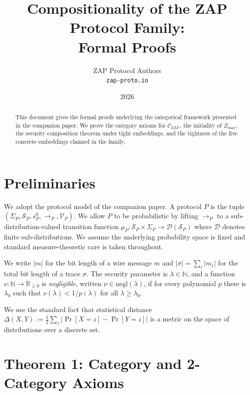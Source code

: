 \documentclass[11pt]{article}
\title{Compositionality of the ZAP Protocol Family:\\Formal Proofs}
\author{ZAP Protocol Authors\\\texttt{zap-proto.io}}
\date{2026}
\theoremstyle{definition}
\theoremstyle{remark}
\newcommand{\CZ}{\mathcal{C}_{\mathrm{ZAP}}}
\newcommand{\Zb}{Z_{\mathrm{base}}}
\begin{document}
\maketitle

\begin{abstract}
This document gives the formal proofs underlying the categorical
framework presented in the companion paper. We prove the category
axioms for $\CZ$, the initiality of $\Zb$, the security composition
theorem under tight embeddings, and the tightness of the five
concrete embeddings claimed in the family.
\end{abstract}

\tableofcontents

\section{Preliminaries}
\label{sec:prelim}

We adopt the protocol model of the companion paper. A protocol $P$
is the tuple $(\Sigma_P, \mathcal{S}_P, s^0_P, \to_P,
\mathcal{V}_P)$. We allow $P$ to be probabilistic by lifting $\to_P$
to a sub-distribution-valued transition function
$\mu_P : \mathcal{S}_P \times \Sigma_P \to \mathcal{D}(\mathcal{S}_P)$
where $\mathcal{D}$ denotes finite sub-distributions. We assume the
underlying probability space is fixed and standard measure-theoretic
care is taken throughout.

We write $|m|$ for the bit length of a wire message $m$ and
$|\sigma| = \sum_i |m_i|$ for the total bit length of a trace
$\sigma$. The security parameter is $\lambda \in \mathbb{N}$, and a
function $\nu : \mathbb{N} \to \mathbb{R}_{\ge 0}$ is
\emph{negligible}, written $\nu \in \mathrm{negl}(\lambda)$, if for
every polynomial $p$ there is $\lambda_0$ such that $\nu(\lambda) <
1/p(\lambda)$ for all $\lambda \ge \lambda_0$.

We use the standard fact that statistical distance
$\Delta(X, Y) := \frac{1}{2}\sum_{z}|\Pr[X = z] - \Pr[Y = z]|$ is a
metric on the space of distributions over a discrete set.

\section{Theorem 1: Category and 2-Category Axioms}
\label{sec:cat-axioms}
\end{document}
